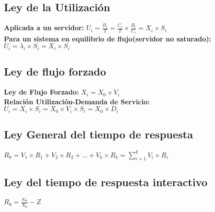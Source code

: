 \subsection{Ley de la Utilización}
\textbf{Aplicada a un servidor: } $U_i=\frac{B_i}{T}= \frac{C_i}{T} \times \frac{B_i}{C_i} = X_i \times S_i$\\
\textbf{Para un sistema en equilibrio de flujo(servidor no saturado): }\\ $U_i=\lambda_i \times S_i=X_i \times S_i$
\subsection{Ley de flujo forzado}
\textbf{Ley de Flujo Forzado: } $X_i=X_0 \times V_i$\\
\textbf{Relación Utilización-Demanda de Servicio: } $U_i=X_i \times S_i=X_0 \times V_i \times S_i = X_0 \times D_i$
\subsection{Ley General del tiempo de respuesta}
$R_0 = V_1 \times R_1 + V_2 \times R_2+...+ V_k \times R_k = \sum_{i=1}^k V_i \times R_i $
\subsection{Ley del tiempo de respuesta interactivo}
$R_0 =\frac{N_T}{X_0} - Z$
